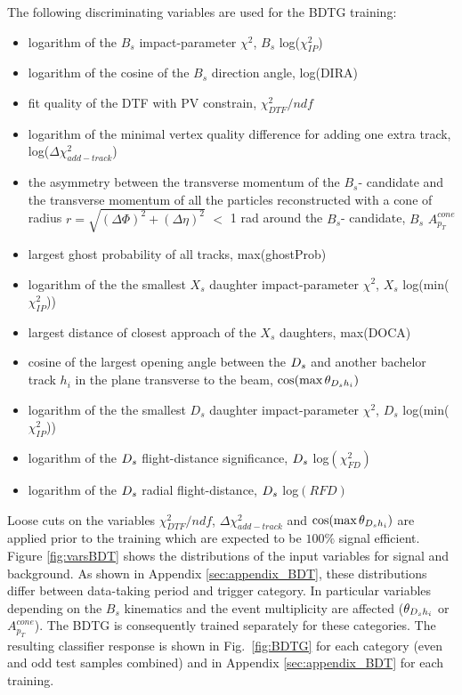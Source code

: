 The following discriminating variables are used for the BDTG training:
\begin{itemize} 

	\item logarithm of the $B_s$ impact-parameter $\chi^{2}$, $B_{s}$ log($\chi^{2}_{IP}$)

	\item logarithm of the cosine of the $B_s$ direction angle, log(DIRA)
	
	\item fit quality of the DTF with PV constrain, $\chi^2_{DTF}/ndf$
	
	\item logarithm of the minimal vertex quality difference for adding one extra track,  log($\Delta\chi^2_{add-track}$)
	
	\item  the asymmetry between the transverse momentum
	 of the $B_s$- candidate and the transverse momentum of all the particles reconstructed
	 with a cone of radius $r = \sqrt{(\Delta\Phi)^{2} + (\Delta\eta)^{2}}$ $<$ 1 rad around the $B_s$- candidate, $B_s$ $A^{cone}_{p_T}$ 
		
	\item largest ghost probability of all tracks, max(ghostProb)

	\item logarithm of the the smallest $X_{s}$ daughter impact-parameter $\chi^{2}$,  $X_{s}$ log(min($\chi^{2}_{IP}$))

	\item largest distance of closest approach of the $X_{s}$ daughters, max(DOCA)

	\item cosine of the largest opening angle between the ${{D}_{s}}$ and another bachelor track $h_i$ in the plane transverse to the beam, $\cos(\text{max} \, \theta_{{{D}_{s}} h_{i}})$
	
	\item logarithm of the the smallest $D_{s}$ daughter impact-parameter $\chi^{2}$,  $D_{s}$ log(min($\chi^{2}_{IP}$))

	\item logarithm of the ${{D}_{s}}$ flight-distance significance, ${{D}_{s}}$ log$(\chi^2_{FD})$

	\item logarithm of the ${{D}_{s}}$ radial flight-distance, ${{D}_{s}}$ log$(RFD)$

\end{itemize}
Loose cuts on the variables  $\chi^2_{DTF}/ndf$,  $\Delta\chi^2_{add-track}$ and $\cos(\text{max} \, \theta_{{{D}_{s}} h_{i}})$ are applied prior to the training which are expected to be $100 \%$ signal efficient.
Figure \ref{fig:varsBDT} shows the distributions of the input variables for signal and background.
As shown in Appendix \ref{sec:appendix_BDT}, these distributions differ between data-taking period and trigger category.
In particular variables depending on the $B_s$ kinematics and the event multiplicity are affected (\eg $\theta_{{{D}_{s}} h_{i}}$ or $A^{cone}_{p_T}$).
The BDTG is consequently trained separately for these categories.
The resulting classifier response is shown in Fig.~\ref{fig:BDTG} for each category (even and odd test samples combined) and in Appendix \ref{sec:appendix_BDT} for each training.

